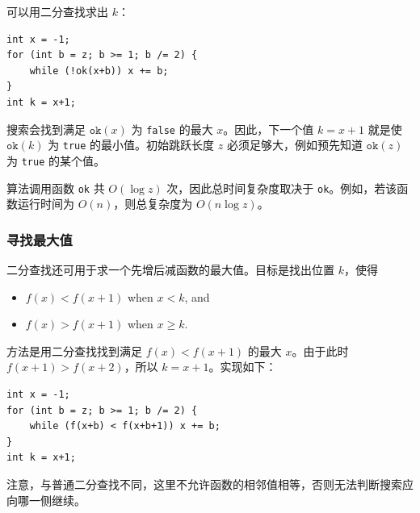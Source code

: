 \noindent
可以用二分查找求出 $k$：

\begin{lstlisting}
int x = -1;
for (int b = z; b >= 1; b /= 2) {
    while (!ok(x+b)) x += b;
}
int k = x+1;
\end{lstlisting}

搜索会找到满足 $\texttt{ok}(x)$ 为 \texttt{false} 的最大 $x$。因此，下一个值 $k=x+1$ 就是使 $\texttt{ok}(k)$ 为 \texttt{true} 的最小值。初始跳跃长度 $z$ 必须足够大，例如预先知道 $\texttt{ok}(z)$ 为 \texttt{true} 的某个值。

算法调用函数 \texttt{ok} 共 $O(\log z)$ 次，因此总时间复杂度取决于 \texttt{ok}。例如，若该函数运行时间为 $O(n)$，则总复杂度为 $O(n \log z)$。

\subsubsection{寻找最大值}

二分查找还可用于求一个先增后减函数的最大值。目标是找出位置 $k$，使得

\begin{itemize}
\item
$f(x)<f(x+1)$ when $x<k$, and
\item
$f(x)>f(x+1)$ when $x \ge k$.
\end{itemize}

方法是用二分查找找到满足 $f(x)<f(x+1)$ 的最大 $x$。由于此时 $f(x+1)>f(x+2)$，所以 $k=x+1$。实现如下：

\begin{lstlisting}
int x = -1;
for (int b = z; b >= 1; b /= 2) {
    while (f(x+b) < f(x+b+1)) x += b;
}
int k = x+1;
\end{lstlisting}

注意，与普通二分查找不同，这里不允许函数的相邻值相等，否则无法判断搜索应向哪一侧继续。
